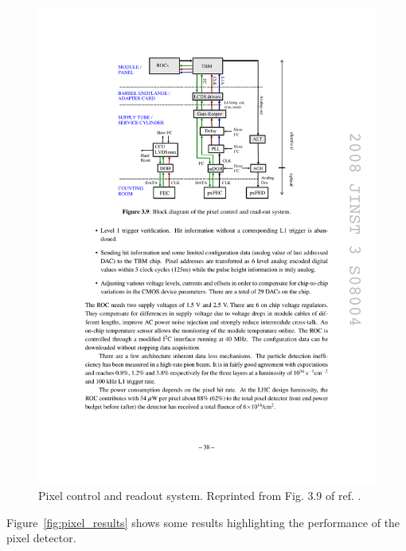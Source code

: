\documentclass[dissertation.tex]{subfiles}
\begin{document}
\begin{figure}
	\centering
	\includegraphics[scale=1.0]{pixel_readout}
	\caption{Pixel control and readout system.  Reprinted from Fig. 3.9 of ref. \cite{1748-0221-3-08-S08004}.}
	\label{fig:pixel_readout}
\end{figure}

Figure~\ref{fig:pixel_results} shows some results highlighting the performance of the pixel detector.
\end{document}
